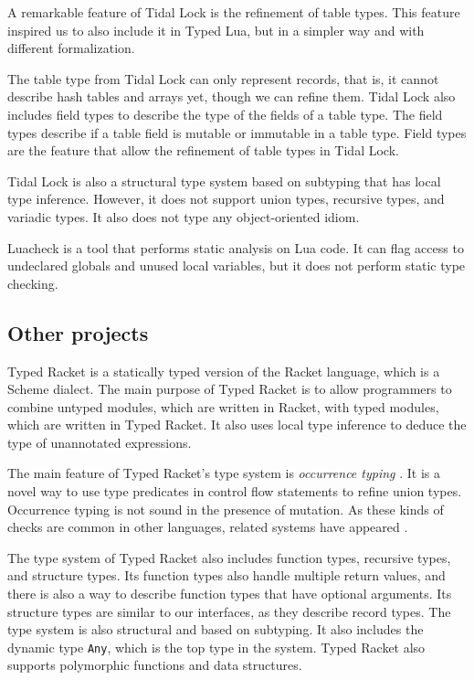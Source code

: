 A remarkable feature of Tidal Lock is the refinement of table types.
This feature inspired us to also include it in Typed Lua,
but in a simpler way and with different formalization.

The table type from Tidal Lock can only represent records, that is,
it cannot describe hash tables and arrays yet, though we can refine them.
Tidal Lock also includes field types to describe the type of the fields
of a table type.
The field types describe if a table field is mutable or immutable
in a table type.
Field types are the feature that allow the refinement of table types in
Tidal Lock.

Tidal Lock is also a structural type system based on subtyping that has
local type inference.
However, it does not support union types, recursive types, and variadic types.
It also does not type any object-oriented idiom.

Luacheck \citep{luacheck} is a tool that performs static analysis on Lua code.
It can flag access to undeclared globals and unused local variables,
but it does not perform static type checking.

\subsection{Other projects}

Typed Racket \citep{tobin-hochstadt2008ts} is a statically typed version
of the Racket language, which is a Scheme dialect.
The main purpose of Typed Racket is to allow programmers to combine
untyped modules, which are written in Racket, with typed modules, which are
written in Typed Racket.
It also uses local type inference to deduce the type of unannotated expressions.

The main feature of Typed Racket's type system is \emph{occurrence typing}
\citep{tobin-hochstadt2010ltu}.
It is a novel way to use type predicates in control flow statements
to refine union types.
Occurrence typing is not sound in the presence of mutation.
As these kinds of checks are common in other languages, related systems
have appeared \citep{guha2011tlc,winther2011gtp,pearce2013ccf}. 

The type system of Typed Racket also includes function types, recursive
types, and structure types.
Its function types also handle multiple return values, and there is
also a way to describe function types that have optional arguments.
Its structure types are similar to our interfaces, as they describe record types.
The type system is also structural and based on subtyping.
It also includes the dynamic type \texttt{Any}, which is the top type in the system.
Typed Racket also supports polymorphic functions and data structures.

